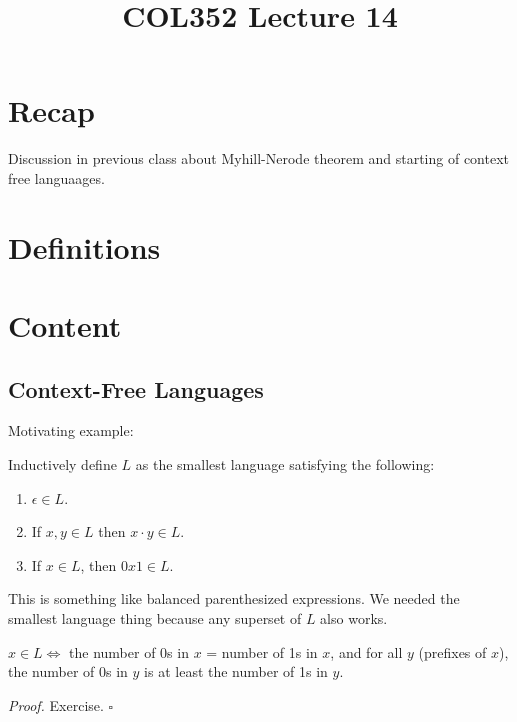 \documentclass[a4paper]{article}
\title{\textbf{COL352 Lecture 14}}
\date{}
\newenvironment{proof}{\begin{breakbox}\textit{Proof.}}{\hfill$\square$\end{breakbox}}
\begin{document}
\maketitle
\tableofcontents

\section{Recap}

Discussion in previous class about Myhill-Nerode theorem and starting of context free languaages.

\section{Definitions}

\section{Content}

\subsection{Context-Free Languages}

Motivating example:

\begin{eg}
    Inductively define $L$ as the smallest language satisfying the following:
    \begin{enumerate}
        \item $\epsilon \in L$.
        \item If $x, y \in L$ then $x \cdot y \in L$.
        \item If $x \in L$, then $0x1 \in L$.
    \end{enumerate}
\end{eg}

\begin{note}
    This is something like balanced parenthesized expressions. We needed the smallest language thing because any superset of $L$ also works.
\end{note}

\begin{claim}
    $x \in L \iff $ the number of 0s in $x$ = number of 1s in $x$, and for all $y$ (prefixes of $x$), the number of 0s in $y$ is at least the number of 1s in $y$.
\end{claim}

\begin{proof}
    Exercise.
\end{proof}
\end{document}
